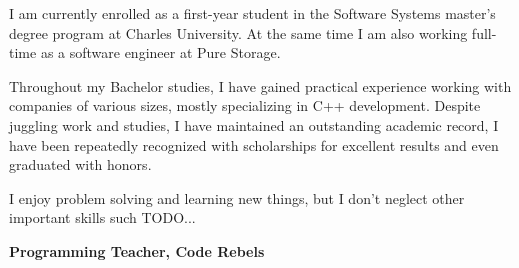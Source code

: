 \documentclass[10pt,a4paper,ragged2e]{altacv}
\begin{document}

\begin{fullwidth}
\makecvheader
\end{fullwidth}


 I am currently enrolled as a first-year student in the Software Systems master's degree program at Charles University. At the same time I am also working full-time as a software engineer at Pure Storage.

\vspace{4px}

Throughout my Bachelor studies, I have gained practical experience working with companies of various sizes, mostly specializing in C++ development. Despite juggling work and studies, I have maintained an outstanding academic record, I have been repeatedly recognized with scholarships for excellent results and even graduated with honors.

\vspace{4px}

I enjoy problem solving and learning new things, but I don't neglect other important skills such TODO...

\vspace{8px}




\vspace{8px}


\textbf{Programming Teacher, Code Rebels}
\end{document}
